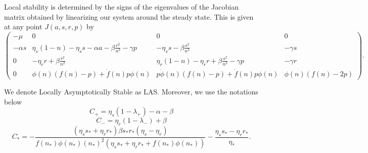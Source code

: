 Local stability is determined by the signs of the eigenvalues of the Jacobian matrix obtained by linearizing our system around the steady state. This is given at any point $J(a,s,r,p)$ by
$$\begin{pmatrix}
	-\mu & 0 & 0 & 0 \\
	-\alpha s & \eta_s (1-n) - \eta_s s - \alpha a - \beta \frac{r^2}{n^2} - \gamma p & -\eta_s s - \beta \frac{s^2}{n^2} & -\gamma s \\
	0 & -\eta_r r + \beta \frac{r^2}{n^2} & \eta_r (1-n) - \eta_r r + \beta \frac{s^2}{n^2} - \gamma p & -\gamma r \\
	0 & \phi(n) (f(n)-p) + \dot{f}(n) p \phi(n) & p \dot{\phi}(n) (f(n)-p) + \dot{f}(n) p \phi(n) & \phi(n) (f(n)-2p)
\end{pmatrix}.$$


We denote Locally Asymptotically Stable as LAS. Moreover, we use the notations below
$$C_{+} = \eta_{s}\left(1 - \lambda_{+}\right) - \alpha - \beta$$
$$ C_{-} = \eta_{r}\left(1 - \lambda_{-}\right) + \beta$$
$$C_* = -\frac{\left(\eta_s s_* + \eta_r r_*\right) \beta s_* r_* \left(\eta_s - \eta_r\right)}{f(n_*)\phi(n_*) (n_*)^2 \left(\eta_s s_* + \eta_r r_* + f(n_*)\phi(n_*)\right)} - \frac{\eta_s s_* - \eta_r r_*}{\eta_*} .$$

